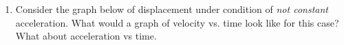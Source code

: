 \begin{enumerate}
%



%

\item Consider the graph below of displacement under condition of \emph{not constant} acceleration. What would a graph of velocity vs. time look like for this case? What about acceleration vs time. 







\end{enumerate}
